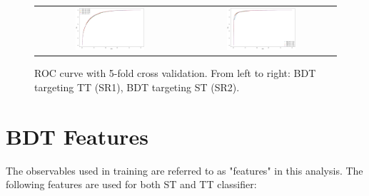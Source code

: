 \begin{figure}[tbh!]
 \begin{center}
 \begin{tabular}{cc}
  \includegraphics[width=0.48\textwidth]{figures/Part3/BDT/5foldTT}&
    \includegraphics[width=0.48\textwidth]{figures/Part3/BDT/5foldST}\\
 \end{tabular}
 \caption{ROC curve with 5-fold cross validation. From left to right: BDT targeting TT (SR1), BDT targeting ST (SR2).}
 \label{fig:ROC}
 \end{center}
\end{figure}

\section{BDT Features}
\label{sec:Input}

The observables used in training are referred to as "features" in this analysis. The following features are used for both ST and TT classifier:

